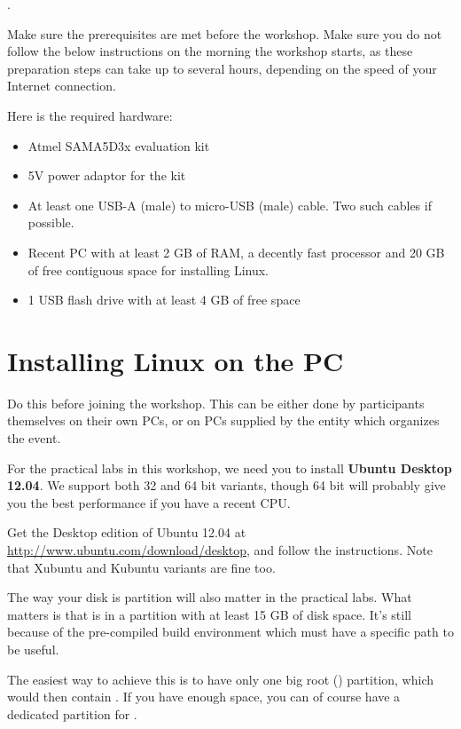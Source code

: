 .

Make sure the prerequisites are met before the workshop. Make sure you
do not follow the below instructions on the morning the workshop starts,
as these preparation steps can take up to several hours, depending
on the speed of your Internet connection.

Here is the required hardware:
\begin{itemize}
\item Atmel SAMA5D3x evaluation kit
\item 5V power adaptor for the kit
\item At least one USB-A (male) to micro-USB (male) cable. Two such
      cables if possible.
\item Recent PC with at least 2 GB of RAM, a decently fast processor
      and 20 GB of free contiguous space for installing Linux.
\item 1 USB flash drive with at least 4 GB of free space
\end{itemize}

\section{Installing Linux on the PC}

Do this before joining the workshop. This can be either done by
participants themselves on their own PCs, or on PCs supplied by the
entity which organizes the event.
 
For the practical labs in this workshop, we need you to install
{\bf Ubuntu Desktop 12.04}. We support both 32 and 64 bit variants,
though 64 bit will probably give you the best performance
if you have a recent CPU. 

Get the Desktop edition of Ubuntu 12.04 at 
\url{http://www.ubuntu.com/download/desktop}, and follow the
instructions. Note that Xubuntu and Kubuntu variants are fine too.

The way your disk is partition will also matter in the practical labs.
What matters is that  is in a partition with at least 15 GB
of disk space. It's still because of the pre-compiled build environment
which must have a specific path to be useful.

The easiest way to achieve this is to have only one big root (\code{/})
partition, which would then contain . If you have enough
space, you can of course have a dedicated partition for .

